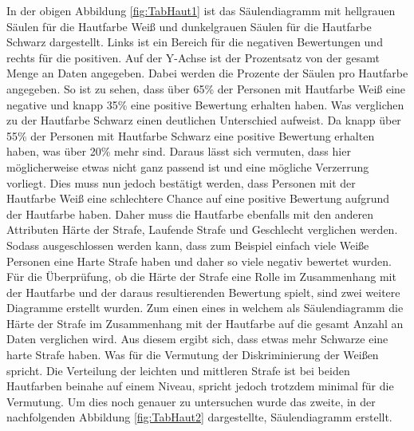 \begin{onehalfspace}
In der obigen Abbildung \ref{fig:TabHaut1} ist das Säulendiagramm mit hellgrauen Säulen für die Hautfarbe Wei{\ss} und dunkelgrauen Säulen für die Hautfarbe Schwarz dargestellt. Links ist ein Bereich für die negativen Bewertungen und rechts für die positiven. Auf der Y-Achse ist der Prozentsatz von der gesamt Menge an Daten angegeben. Dabei werden die Prozente der Säulen pro Hautfarbe angegeben. So ist zu sehen, dass über 65\% der Personen mit Hautfarbe Wei{\ss} eine negative und knapp 35\% eine positive Bewertung erhalten haben. Was verglichen zu der Hautfarbe Schwarz einen deutlichen Unterschied aufweist. Da knapp über 55\% der Personen mit Hautfarbe Schwarz eine positive Bewertung erhalten haben, was über 20\% mehr sind. Daraus lässt sich vermuten, dass hier möglicherweise etwas nicht ganz passend ist und eine mögliche Verzerrung vorliegt. Dies muss nun jedoch bestätigt werden, dass Personen mit der Hautfarbe Wei{\ss} eine schlechtere Chance auf eine positive Bewertung aufgrund der Hautfarbe haben. Daher muss die Hautfarbe ebenfalls mit den anderen Attributen Härte der Strafe, Laufende Strafe und Geschlecht verglichen werden. Sodass ausgeschlossen werden kann, dass zum Beispiel einfach viele Wei{\ss}e Personen eine Harte Strafe haben und daher so viele negativ bewertet wurden.\\
Für die Überprüfung, ob die Härte der Strafe eine Rolle im Zusammenhang mit der Hautfarbe und der daraus resultierenden Bewertung spielt, sind zwei weitere Diagramme erstellt wurden. Zum einen eines in welchem als Säulendiagramm die Härte der Strafe im Zusammenhang mit der Hautfarbe auf die gesamt Anzahl an Daten verglichen wird. Aus diesem ergibt sich, dass etwas mehr Schwarze eine harte Strafe haben. Was für die Vermutung der Diskriminierung der Wei{\ss}en spricht. Die Verteilung der leichten und mittleren Strafe ist bei beiden Hautfarben beinahe auf einem Niveau, spricht jedoch trotzdem minimal für die Vermutung. Um dies noch genauer zu untersuchen wurde das zweite, in der nachfolgenden Abbildung \ref{fig:TabHaut2} dargestellte, Säulendiagramm erstellt.
\begin{figure}[!h]
    \centering

\end{figure}
\end{onehalfspace}
